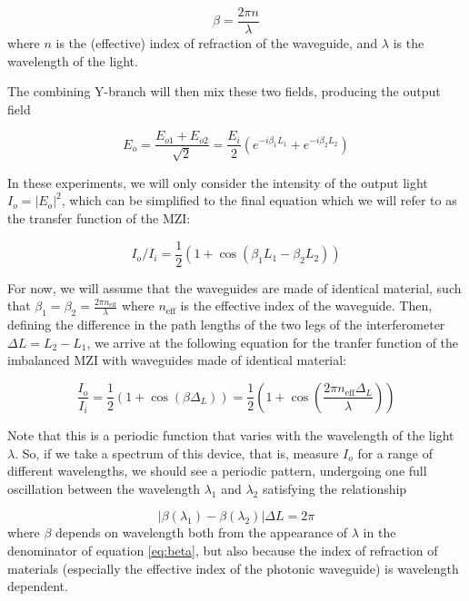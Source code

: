 \documentclass[journal]{IEEEtran}
\begin{document}
\begin{equation}
\beta = \frac{2\pi n}{\lambda}
\label{eq:beta}
\end{equation}
where $n$ is the (effective) index of refraction of the waveguide, and $\lambda$ is the wavelength of the light.

The combining Y-branch will then mix these two fields, producing the output field 

\begin{equation}
E_o = \frac{E_{o1} + E_{o2}}{\sqrt{2}} = \frac{E_i}{2} \left(e^{-i \beta_1 L_1} + e^{-i \beta_2 L_2} \right)
\end{equation}

In these experiments, we will only consider the intensity of the output light $I_o = |E_o|^2$, which can be simplified to the final equation which we will refer to as the transfer function of the MZI:

\begin{equation}
I_o/I_i = \frac{1}{2} (1 + \cos{(\beta_1 L_1 - \beta_2 L_2)})
\label{eq:trans_full}
\end{equation}

For now, we will assume that the waveguides are made of identical material, such that $\beta_1 = \beta_2 = \frac{2 \pi n_{\text{eff}}}{\lambda}$ where $n_{\text{eff}}$ is the effective index of the waveguide. Then, defining the difference in the path lengths of the two legs of the interferometer $\Delta L = L_2 - L_1$, we arrive at the following equation for the tranfer function of the imbalanced MZI with waveguides made of identical material:

\begin{equation}
\frac{I_o}{I_i} = \frac{1}{2} \left(1 + \cos{(\beta \Delta_L)}\right) = \frac{1}{2} \left(1 + \cos{\left(\frac{2\pi n_{\text{eff}} \Delta_L}{\lambda}\right)}\right)
\end{equation}

Note that this is a periodic function that varies with the wavelength of the light $\lambda$. So, if we take a spectrum of this device, that is, measure $I_o$ for a range of different wavelengths, we should see a periodic pattern, undergoing one full oscillation between the wavelength $\lambda_1$ and $\lambda_2$ satisfying the relationship 

\begin{equation}
|\beta(\lambda_1) - \beta(\lambda_2)| \Delta L = 2 \pi
\label{eq:FSR_cond}
\end{equation}
where $\beta$ depends on wavelength both from the appearance of $\lambda$ in the denominator of equation \ref{eq:beta}, but also because the index of refraction of materials (especially the effective index of the photonic waveguide) is wavelength dependent.  
\end{document}
